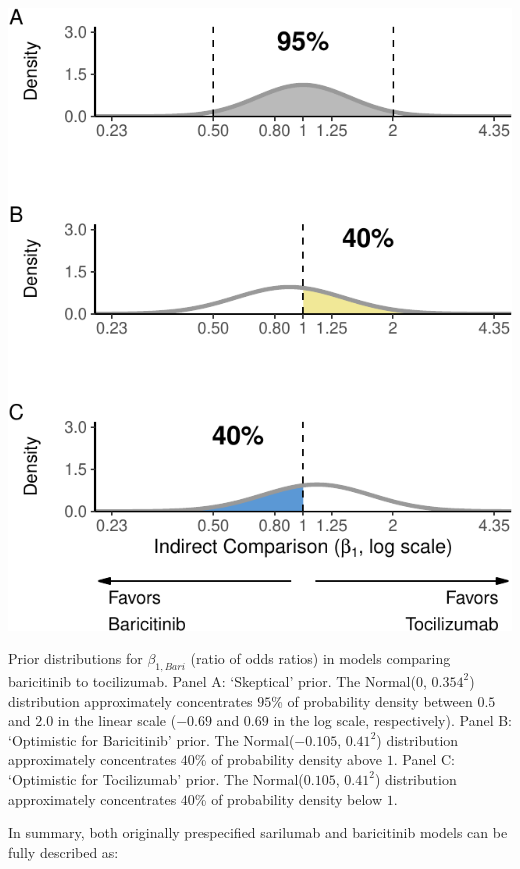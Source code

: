 \documentclass[
  12pt,
]{article}
\begin{document}
\begin{center}\includegraphics{supplementary_material_files/figure-latex/unnamed-chunk-2-1} \end{center}

Prior distributions for \(\beta_{1, Bari}\) (ratio of odds ratios) in
models comparing baricitinib to tocilizumab. Panel A: `Skeptical' prior.
The Normal(\(0\), \(0.354^2\)) distribution approximately concentrates
\(95\)\% of probability density between \(0.5\) and \(2.0\) in the
linear scale (\(-0.69\) and \(0.69\) in the log scale, respectively).
Panel B: `Optimistic for Baricitinib' prior. The Normal(\(-0.105\),
\(0.41^2\)) distribution approximately concentrates \(40\)\% of
probability density above \(1\). Panel C: `Optimistic for Tocilizumab'
prior. The Normal(\(0.105\), \(0.41^2\)) distribution approximately
concentrates \(40\)\% of probability density below \(1\).

\newpage

In summary, both originally prespecified sarilumab and baricitinib
models can be fully described as:
\end{document}
